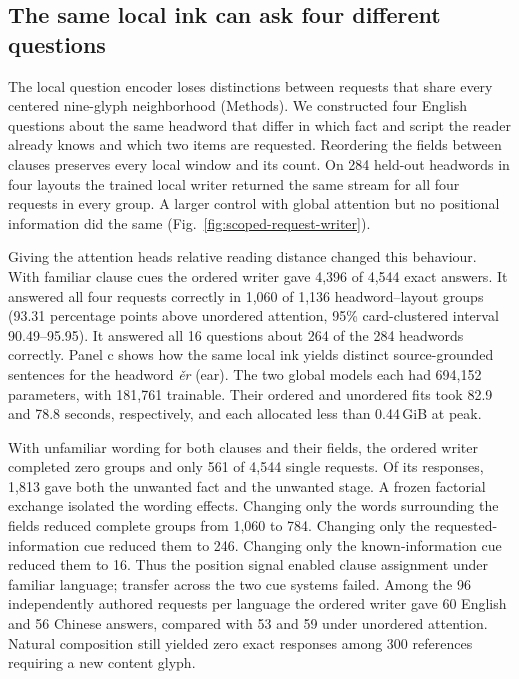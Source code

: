 \subsection*{The same local ink can ask four different questions}
The local question encoder loses distinctions between requests that share every centered nine-glyph neighborhood (Methods). We constructed four English questions about the same headword that differ in which fact and script the reader already knows and which two items are requested. Reordering the fields between clauses preserves every local window and its count. On 284 held-out headwords in four layouts the trained local writer returned the same stream for all four requests in every group. A larger control with global attention but no positional information did the same (Fig.~\ref{fig:scoped-request-writer}).

Giving the attention heads relative reading distance changed this behaviour. With familiar clause cues the ordered writer gave 4,396 of 4,544 exact answers. It answered all four requests correctly in 1,060 of 1,136 headword--layout groups (93.31 percentage points above unordered attention, 95\% card-clustered interval 90.49--95.95). It answered all 16 questions about 264 of the 284 headwords correctly. Panel c shows how the same local ink yields distinct source-grounded sentences for the headword \textit{\v{e}r} (ear). The two global models each had 694,152 parameters, with 181,761 trainable. Their ordered and unordered fits took 82.9 and 78.8 seconds, respectively, and each allocated less than 0.44\,GiB at peak.

With unfamiliar wording for both clauses and their fields, the ordered writer completed zero groups and only 561 of 4,544 single requests. Of its responses, 1,813 gave both the unwanted fact and the unwanted stage. A frozen factorial exchange isolated the wording effects. Changing only the words surrounding the fields reduced complete groups from 1,060 to 784. Changing only the requested-information cue reduced them to 246. Changing only the known-information cue reduced them to 16. Thus the position signal enabled clause assignment under familiar language; transfer across the two cue systems failed. Among the 96 independently authored requests per language the ordered writer gave 60 English and 56 Chinese answers, compared with 53 and 59 under unordered attention. Natural composition still yielded zero exact responses among 300 references requiring a new content glyph.
